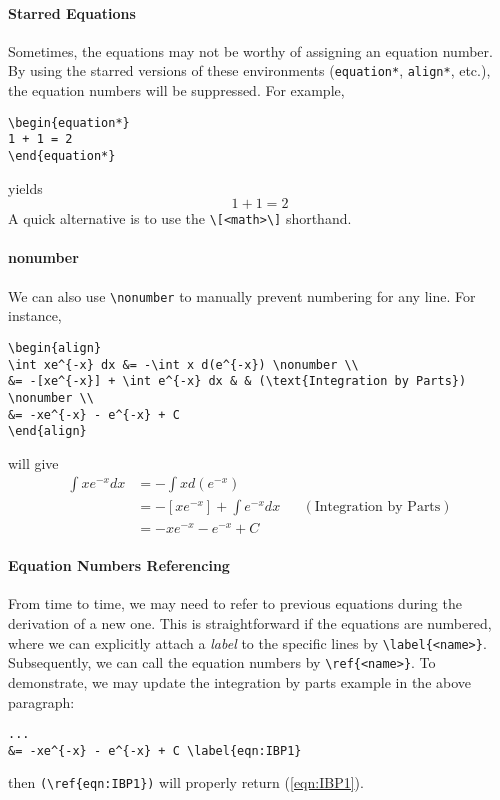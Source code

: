 \paragraph{Starred Equations}
Sometimes, the equations may not be worthy of assigning an equation number. By using the starred versions of these environments (\texttt{equation*}, \texttt{align*}, etc.), the equation numbers will be suppressed. For example,
\begin{lstlisting}
\begin{equation*}
1 + 1 = 2
\end{equation*}
\end{lstlisting}
yields
\begin{equation*}
1 + 1 = 2
\end{equation*}
A quick alternative is to use the \verb|\[<math>\]| shorthand.

\paragraph{nonumber}
We can also use \texttt{\textbackslash nonumber} to manually prevent numbering for any line. For instance,
\begin{lstlisting}
\begin{align}
\int xe^{-x} dx &= -\int x d(e^{-x}) \nonumber \\
&= -[xe^{-x}] + \int e^{-x} dx & & (\text{Integration by Parts}) \nonumber \\
&= -xe^{-x} - e^{-x} + C 
\end{align}
\end{lstlisting}
will give
\begin{align}
\int xe^{-x} dx &= -\int x d(e^{-x}) \nonumber \\
&= -[xe^{-x}] + \int e^{-x} dx & & (\text{Integration by Parts}) \nonumber \\
&= -xe^{-x} - e^{-x} + C \label{eqn:IBP1}
\end{align}

\paragraph{Equation Numbers Referencing}
From time to time, we may need to refer to previous equations during the derivation of a new one. This is straightforward if the equations are numbered, where we can explicitly attach a \textit{label} to the specific lines by \texttt{\textbackslash label\{<name>\}}. Subsequently, we can call the equation numbers by \texttt{\textbackslash ref\{<name>\}}. To demonstrate, we may update the integration by parts example in the above paragraph:
\begin{lstlisting}
...
&= -xe^{-x} - e^{-x} + C \label{eqn:IBP1}
\end{lstlisting}
then \texttt{(\textbackslash ref\{eqn:IBP1\})} will properly return (\ref{eqn:IBP1}).

